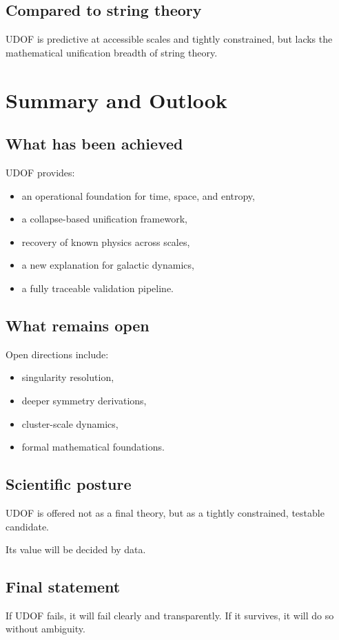 \documentclass[11pt]{book}
\begin{document}
\section{Compared to string theory}

UDOF is predictive at accessible scales and tightly constrained,
but lacks the mathematical unification breadth of string theory.

\chapter{Summary and Outlook}

\section{What has been achieved}

UDOF provides:
\begin{itemize}
\item an operational foundation for time, space, and entropy,
\item a collapse-based unification framework,
\item recovery of known physics across scales,
\item a new explanation for galactic dynamics,
\item a fully traceable validation pipeline.
\end{itemize}

\section{What remains open}

Open directions include:
\begin{itemize}
\item singularity resolution,
\item deeper symmetry derivations,
\item cluster-scale dynamics,
\item formal mathematical foundations.
\end{itemize}

\section{Scientific posture}

UDOF is offered not as a final theory,
but as a tightly constrained, testable candidate.

Its value will be decided by data.

\section{Final statement}

If UDOF fails, it will fail clearly and transparently.
If it survives, it will do so without ambiguity.

\end{document}
